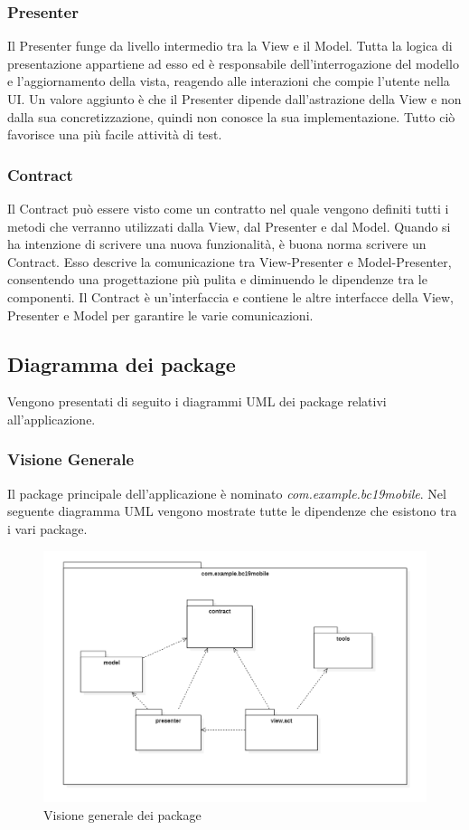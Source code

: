 \subsubsection{Presenter}
Il Presenter funge da livello intermedio tra la View e il Model. Tutta la logica di presentazione appartiene ad esso ed è responsabile dell'interrogazione del modello e l'aggiornamento della vista, reagendo alle interazioni che compie l'utente nella UI. Un valore aggiunto è che il Presenter dipende dall'astrazione della View e non dalla sua concretizzazione, quindi non conosce la sua implementazione. Tutto ciò favorisce una più facile attività di test.

\subsubsection{Contract}
Il Contract può essere visto come un contratto nel quale vengono definiti tutti i metodi che verranno utilizzati dalla View, dal Presenter e dal Model. Quando si ha intenzione di scrivere una nuova funzionalità, è buona norma scrivere un Contract. Esso descrive la comunicazione tra View-Presenter e Model-Presenter, consentendo una progettazione più pulita e diminuendo le dipendenze tra le componenti.
Il Contract è un'interfaccia e contiene le altre interfacce della View, Presenter e Model per garantire le varie comunicazioni.


\subsection{Diagramma dei package}
Vengono presentati di seguito i diagrammi UML dei package relativi all'applicazione.

\subsubsection{Visione Generale}
Il package principale dell'applicazione è nominato \textit{com.example.bc19mobile}.
Nel seguente diagramma UML vengono mostrate tutte le dipendenze che esistono tra i vari package.
\begin{figure}[H]
	\centering
	\includegraphics[width=16cm]{res/images/apputenti-packageGenerale.png}
	\caption{Visione generale dei package}
	\label{fig:Visione generale dei package}
\end{figure}

